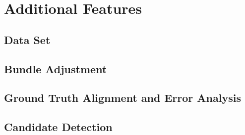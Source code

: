 \chapter{Additional Features}
\section{Data Set}

\section{Bundle Adjustment}

\section{Ground Truth Alignment and Error Analysis}

\section{Candidate Detection}